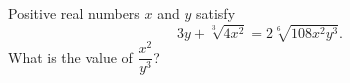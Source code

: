 Positive real numbers $x$ and $y$ satisfy
\[
3y+\sqrt[3]{4x^2}=2\sqrt[6]{108x^2y^3}.
\]
What is the value of $\dfrac{x^2}{y^3}$?
